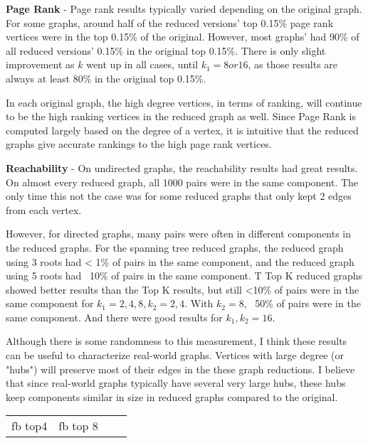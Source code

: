\documentclass[11pt]{article}
\begin{document}
\textbf{Page Rank} - Page rank results typically varied depending on the original graph.  For some graphs, around half of the reduced versions' top 0.15\% page rank vertices were in the top 0.15\% of the original. However, most graphs' had 90\% of all reduced versions' 0.15\% in the original top 0.15\%.  There is only slight improvement as $k$ went up in all cases, until $k_1 = 8 or 16$, as those results are always at least 80\% in the original top 0.15\%.

In each original graph, the high degree vertices, in terms of ranking, will continue to be the high ranking vertices in the reduced graph as well.  Since Page Rank is computed largely based on the degree of a vertex, it is intuitive that the reduced graphs give accurate rankings to the high page rank vertices.


\textbf{Reachability} - On undirected graphs, the reachability results had great results.  On almost every reduced graph, all 1000 pairs were in the same component.  The only time this not the case was for some reduced graphs that only kept 2 edges from each vertex.

However, for directed graphs, many pairs were often in different components in the reduced graphs.  For the spanning tree reduced graphs, the reduced graph using 3 roots had < 1\% of pairs in the same component, and the reduced graph using 5 roots had ~10\% of pairs in the same component.  T Top K reduced graphs showed better results than the Top K results, but still <10\% of pairs were in the same component for $k_1 = 2, 4, 8, k_2 = 2, 4$.  With $k_2 = 8$, ~50\% of pairs were in the same component.  And there were good results for $k_1, k_2 = 16$.

Although there is some randomness to this measurement, I think these results can be useful to characterize real-world graphs.  Vertices with large degree (or "hubs") will preserve most of their edges in the these graph reductions.  I believe that since real-world graphs typically have several very large hubs, these hubs keep components similar in size in reduced graphs compared to the original.




\begin{tabular}{l | c | c | c |}
	fb top4 & fb top 8 

\end{tabular} 
\end{document}
